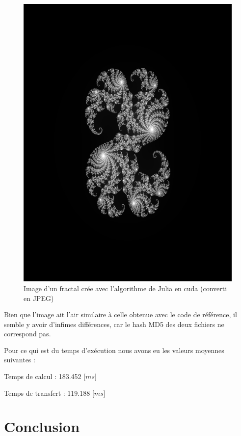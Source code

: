 \documentclass[12pt,a4paper,oneside, titlepage]{report}
\begin{document}
		\begin{figure}[H]
			\centering
			\includegraphics[scale=0.20]{../TP5/images/julia_thread_simple}
			\caption {Image d'un fractal crée avec l'algorithme de Julia en cuda (converti en JPEG)}
		\end{figure}

		Bien que l'image ait l'air similaire à celle obtenue avec le code de référence, il semble y avoir d'infimes différences, car le hash MD5 des deux fichiers ne correspond pas.

		Pour ce qui est du temps d'exécution nous avons eu les valeurs moyennes suivantes :

		Temps de calcul : 183.452 [$ms$]

		Temps de transfert : 119.188 [$ms$]

	\section*{Conclusion}
\end{document}
